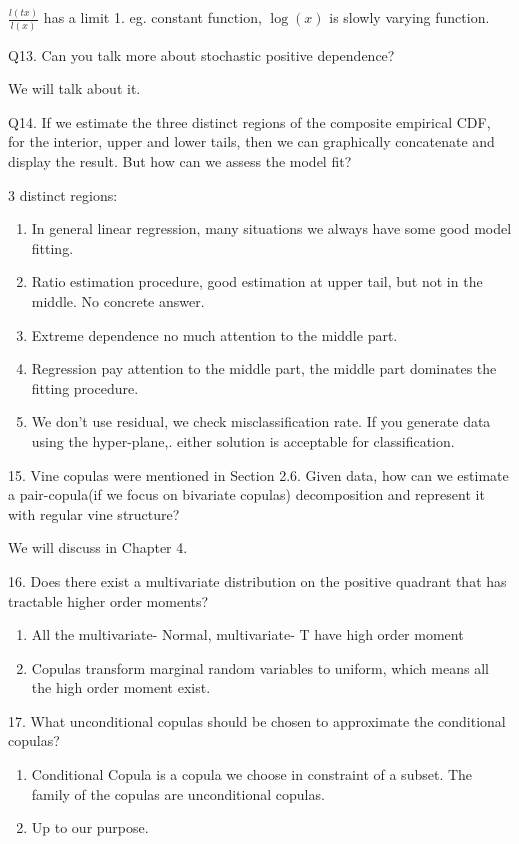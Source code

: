 \documentclass[a4paper,12pt]{texMemo}
\begin{document}
$\frac{l(tx)}{l(x)}$ has a limit 1. eg. constant function, $\log(x)$ is slowly varying function. 

Q13. Can you talk more about stochastic positive dependence?

We will talk about it. 

Q14. If we estimate the three distinct regions of the composite empirical CDF, for the interior, upper and lower tails, then we can graphically concatenate and display the result. But how can we assess the model fit?

3 distinct regions:
\begin{enumerate}
\item In general linear regression, many situations we always have some good model fitting. 
\item Ratio estimation procedure, good estimation at upper tail, but not in the middle. No concrete answer.
\item Extreme dependence no much attention to the middle part.
\item Regression pay attention to the middle part, the middle part dominates the fitting procedure. 
\item We don't use residual, we check misclassification rate. 
If you generate data using the hyper-plane,. either solution is acceptable for classification. 
\end{enumerate}

15. Vine copulas were mentioned in Section 2.6. Given data, how can we estimate a pair-copula(if we focus on bivariate copulas) decomposition and represent it with regular vine structure?

We will discuss in Chapter 4.

16. Does there exist a multivariate distribution on the positive quadrant that has tractable higher order moments? 

\begin{enumerate}
\item All the multivariate- Normal, multivariate- T have high order moment
\item Copulas transform marginal random variables to uniform, which means all the high order moment exist.
\end{enumerate}

17. What unconditional copulas should be chosen to approximate the conditional copulas?

\begin{enumerate}
\item Conditional Copula is a copula we choose in constraint of a subset. The family of the copulas are unconditional copulas. 
\item Up to our purpose.
\end{enumerate}
\end{document}
